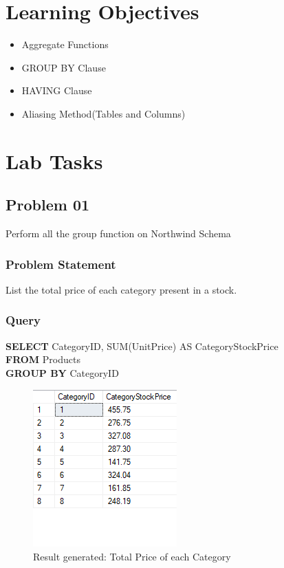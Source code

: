 \documentclass[12pt,a4paper]{report}
\begin{document}
\section{Learning Objectives}
\begin{itemize}
	\item Aggregate Functions
	\item GROUP BY Clause
	\item HAVING Clause
	\item Aliasing Method(Tables and Columns)
\end{itemize}
\newpage

\section{Lab Tasks}
\subsection{Problem 01}
Perform all the group function on Northwind Schema
\subsubsection{Problem Statement}
List the total price of each category present in a stock.
\subsubsection{Query}
\begin{center}
	\begin{minipage}{12cm}
		\textbf{SELECT} CategoryID, SUM(UnitPrice) AS CategoryStockPrice\\
		\textbf{FROM} Products\\
		\textbf{GROUP BY} CategoryID
	\end{minipage}
	\begin{figure}[h]
	\centering
		\includegraphics[scale=0.7]{images/1.png}
		\caption{Result generated: Total Price of each Category}
	\end{figure}
\end{center}
\end{document}
